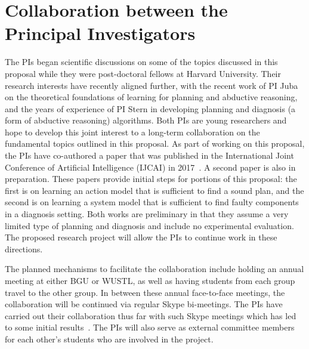 \documentclass[12pt]{article}
\begin{document}
\section{Collaboration between the Principal Investigators}
The PIs began scientific discussions on some of the topics discussed in this proposal while they were post-doctoral fellows at Harvard University.
Their research interests have recently aligned further, 
with the recent work of PI Juba on the theoretical foundations of learning for planning and abductive reasoning, and the years of experience of PI Stern in developing planning and diagnosis (a form of abductive reasoning) algorithms. 
Both PIs are young researchers and hope to develop this joint interest to a long-term collaboration on the fundamental topics outlined in this proposal.
As part of working on this proposal, the PIs have co-authored a paper that was published in the International Joint Conference of Artificial Intelligence (IJCAI) in  2017~\cite{stern2017efficientAndSafe}. A second paper is also in preparation. These papers provide initial steps for portions of this proposal: the first is on learning an action model that is sufficient to find a sound plan, and the second is on learning a system model that is sufficient to find faulty components in a diagnosis setting. Both works are preliminary in that they assume a very limited type of planning and diagnosis and include no experimental evaluation. The proposed research project will allow the PIs to continue  work in these directions.


The planned mechanisms to facilitate the collaboration include holding an annual meeting at either BGU or WUSTL, as well as having students from each group travel to the other group. In between these annual face-to-face meetings, the collaboration will be continued via regular Skype bi-meetings. The PIs have carried out their collaboration thus far with such Skype meetings which has led to some initial results~\cite{stern2017efficientAndSafe}.  
The PIs will also serve as external committee members for each other's students who are involved in the project.
\end{document}
